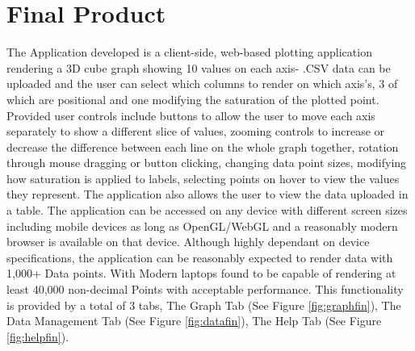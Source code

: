 \section{Final Product}
The Application developed is a client-side, web-based plotting application rendering a 3D cube graph showing 10 values on each axis- .CSV data can be uploaded and the user can select which columns to render on which axis's, 3 of which are positional and one modifying the saturation of the plotted point.
Provided user controls include buttons to allow the user to move each axis separately to show a different slice of values, zooming controls to increase or decrease the difference between each line on the whole graph together, rotation through mouse dragging or button clicking, changing data point sizes, modifying how saturation is applied to labels, selecting points on hover to view the values they represent. The application also allows the user to view the data uploaded in a table.
The application can be accessed on any device with different screen sizes including mobile devices as long as OpenGL/WebGL and a reasonably modern browser is available on that device. Although highly dependant on device specifications, the application can be reasonably expected to render data with 1,000+ Data points. With Modern laptops found to be capable of rendering at least 40,000 non-decimal Points with acceptable performance.
This functionality is provided by a total of 3 tabs, The Graph Tab (See Figure \ref{fig:graphfin}), The Data Management Tab (See Figure \ref{fig:datafin}), The Help Tab (See Figure \ref{fig:helpfin}).
